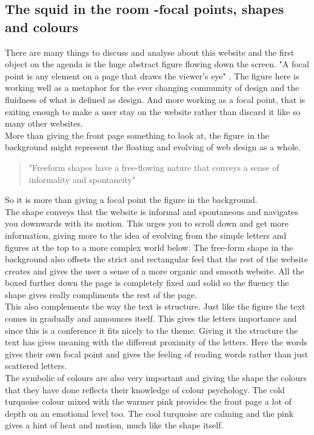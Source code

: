 \documentclass{article}
\begin{document}
	    \subsection{The squid in the room -focal points, shapes and colours}
		    There are many things to discuss and analyse about this website and the first object on the agenda is the huge abstract figure flowing down the screen. "A focal point is any element on a page that draws the viewer’s eye" . The figure here is working well as a metaphor for the ever changing community of design and the fluidness of what is defined as design. And more working as a focal point, that is exiting enough to make a user stay on the website rather than discard it like so many other websites. \\More than giving the front page something to look at, the figure in the background might represent the floating and evolving of web design as a whole.
            \begin{quotation}
                "Freeform shapes have a free-flowing nature that conveys a sense of informality and spontaneity"
            \end{quotation}  So it is more than giving a focal point the figure in the background.\\ The shape conveys that the website is informal and spontaneous and navigates you downwards with its motion. This urges you to scroll down and get more information, giving more to the idea of evolving from the simple letters and figures at the top to a more complex world below. The free-form shape in the background also offsets the strict and rectangular feel that the rest of the website creates and gives the user a sense of a more organic and smooth website. All the boxed further down the page is completely fixed and solid so the fluency the shape gives really compliments the rest of the page. \\This also complements the way the text is structure. Just like the figure the text comes in gradually and announces itself. This gives the letters importance and since this is a conference it fits nicely to the theme. Giving it the structure the text has gives meaning with the different proximity of the letters. Here the words gives their own focal point and gives the feeling of reading words rather than just scattered letters.\\
            The symbolic of colours are also very important and giving the shape the colours that they have done reflects their knowledge of colour psychology. The cold turquoise colour mixed with the warmer pink provides the front page a lot of depth on an emotional level too. The cool turquoise are calming and the pink gives a hint of heat and motion, much like the shape itself. 
\end{document}
